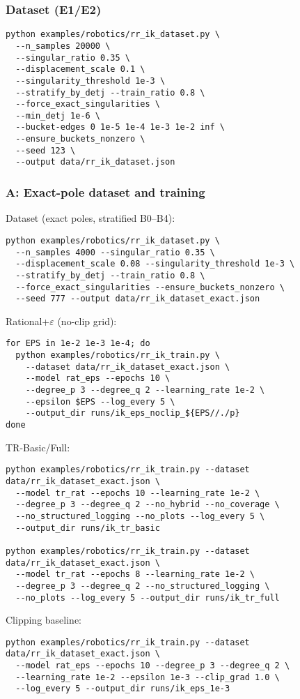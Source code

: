 \documentclass[11pt,twoside]{article}
\begin{document}
\subsubsection{Dataset (E1/E2)}

\begin{verbatim}
python examples/robotics/rr_ik_dataset.py \
  --n_samples 20000 \
  --singular_ratio 0.35 \
  --displacement_scale 0.1 \
  --singularity_threshold 1e-3 \
  --stratify_by_detj --train_ratio 0.8 \
  --force_exact_singularities \
  --min_detj 1e-6 \
  --bucket-edges 0 1e-5 1e-4 1e-3 1e-2 inf \
  --ensure_buckets_nonzero \
  --seed 123 \
  --output data/rr_ik_dataset.json
\end{verbatim}

\subsubsection{A: Exact-pole dataset and training}

Dataset (exact poles, stratified B0--B4):
\begin{verbatim}
python examples/robotics/rr_ik_dataset.py \
  --n_samples 4000 --singular_ratio 0.35 \
  --displacement_scale 0.08 --singularity_threshold 1e-3 \
  --stratify_by_detj --train_ratio 0.8 \
  --force_exact_singularities --ensure_buckets_nonzero \
  --seed 777 --output data/rr_ik_dataset_exact.json
\end{verbatim}
Rational+$\varepsilon$ (no-clip grid):
\begin{verbatim}
for EPS in 1e-2 1e-3 1e-4; do
  python examples/robotics/rr_ik_train.py \
    --dataset data/rr_ik_dataset_exact.json \
    --model rat_eps --epochs 10 \
    --degree_p 3 --degree_q 2 --learning_rate 1e-2 \
    --epsilon $EPS --log_every 5 \
    --output_dir runs/ik_eps_noclip_${EPS//./p}
done
\end{verbatim}
TR-Basic/Full:
\begin{verbatim}
python examples/robotics/rr_ik_train.py --dataset data/rr_ik_dataset_exact.json \
  --model tr_rat --epochs 10 --learning_rate 1e-2 \
  --degree_p 3 --degree_q 2 --no_hybrid --no_coverage \
  --no_structured_logging --no_plots --log_every 5 \
  --output_dir runs/ik_tr_basic

python examples/robotics/rr_ik_train.py --dataset data/rr_ik_dataset_exact.json \
  --model tr_rat --epochs 8 --learning_rate 1e-2 \
  --degree_p 3 --degree_q 2 --no_structured_logging \
  --no_plots --log_every 5 --output_dir runs/ik_tr_full
\end{verbatim}
Clipping baseline:
\begin{verbatim}
python examples/robotics/rr_ik_train.py --dataset data/rr_ik_dataset_exact.json \
  --model rat_eps --epochs 10 --degree_p 3 --degree_q 2 \
  --learning_rate 1e-2 --epsilon 1e-3 --clip_grad 1.0 \
  --log_every 5 --output_dir runs/ik_eps_1e-3
\end{verbatim}
\end{document}
